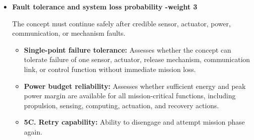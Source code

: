 \begin{itemize}
\begin{itemize}
        \item \textbf{Post-contact dynamics:} Assesses whether the coupled UAV--balloon--payload system remains controllable after capture or contact, including effects such as pendulum motion, asymmetric loading, and changing drag.
    \end{itemize}

    \item \textbf{Fault tolerance and system loss probability -weight 3}

    The concept must continue safely after credible sensor, actuator, power, communication, or mechanism faults.
    
    \begin{itemize}
        \item \textbf{Single-point failure tolerance:} Assesses whether the concept can tolerate failure of one sensor, actuator, release mechanism, communication link, or control function without immediate mission loss.
        
        \item \textbf{Power budget reliability:} Assesses whether sufficient energy and peak power margin are available for all mission-critical functions, including propulsion, sensing, computing, actuation, and recovery actions.

        \item \textbf{5C. Retry capability:} 
        Ability to disengage and attempt mission phase again.
    \end{itemize}
\end{itemize}




